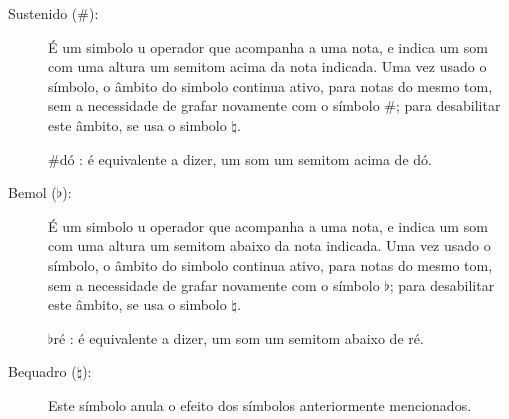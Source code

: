 \begin{description}

\item [Sustenido ($\#$):] \label{sec:pos:Sustenido}
É um simbolo u operador que acompanha a uma nota, 
e indica um som com uma altura um semitom acima da nota indicada.
Uma vez usado o símbolo, o âmbito  do simbolo continua ativo, 
para notas do mesmo tom, sem a necessidade de grafar novamente com o símbolo $\#$;
para desabilitar este âmbito, se usa o simbolo $\natural$. 
\begin{example} $\#$dó : é equivalente a dizer, um som um semitom acima de dó.
\end{example}


\item [Bemol ($\flat$):] \label{sec:pos:Bemol}
É um simbolo u operador que acompanha a uma nota, 
e indica um som com uma altura um semitom abaixo da nota indicada. 
Uma vez usado o símbolo, o âmbito  do simbolo continua ativo, 
para notas do mesmo tom, sem a necessidade de grafar novamente com o símbolo $\flat$;
para desabilitar este âmbito, se usa o simbolo $\natural$. 
\begin{example} $\flat$ré : é equivalente a dizer, um som um semitom abaixo de ré.
\end{example}

\item [Bequadro ($\natural$):] \label{sec:pos:Bequadro}
Este símbolo anula o efeito dos símbolos anteriormente mencionados.

\end{description}~\\


